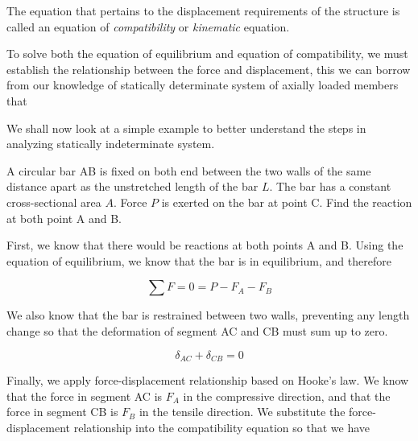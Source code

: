 \documentclass[
fontsize=10pt,
a4paper,
twosides=false,
open=any,
svgnames,
]{kaobook} %
\begin{document}
The equation that pertains to the displacement requirements of the structure is called an equation of \emph{compatibility} or \emph{kinematic} equation.

To solve both the equation of equilibrium and equation of compatibility, we must establish the relationship between the force and displacement, this we can borrow from our knowledge of statically determinate system of axially loaded members that
	
We shall now look at a simple example to better understand the steps in analyzing statically indeterminate system.

\begin{example}
  A circular bar AB is fixed on both end between the two walls of the same distance apart as the unstretched length of the bar $L$. The bar has a constant cross-sectional area $A$. Force $P$ is exerted on the bar at point C. Find the reaction at both point A and B.
  \centering

First, we know that there would be reactions at both points A and B. Using the equation of equilibrium, we know that the bar is in equilibrium, and therefore

\[\sum F  = 0 = P - {F_A} - {F_B}\]

We also know that the bar is restrained between two walls, preventing any length change so that the deformation of segment AC and CB must sum up to zero.

\[{\delta _{AC}} + {\delta _{CB}} = 0\]

Finally, we apply force-displacement relationship based on Hooke’s law. We know that the force in segment AC is $F_A$ in the compressive direction, and that the force in segment CB is $F_B$ in the tensile direction. We substitute the force-displacement relationship into the compatibility equation so that we have


\end{example}
\end{document}
